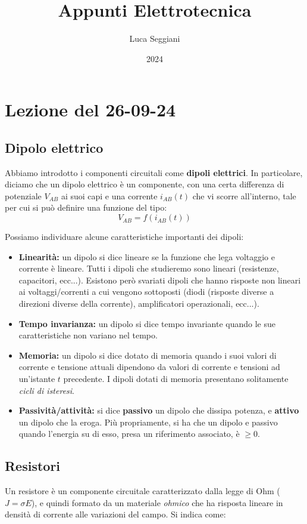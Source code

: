 \documentclass[a4paper,11pt]{article}
\title{Appunti Elettrotecnica}
\author{Luca Seggiani}
\date{2024}
\begin{document}
\section{Lezione del 26-09-24}

\thispagestyle{empty}
\pagestyle{fancy}

\subsection{Dipolo elettrico}
Abbiamo introdotto i componenti circuitali come \textbf{dipoli elettrici}.
In particolare, diciamo che un dipolo elettrico è un componente, con una certa differenza di potenziale $V_{AB}$ ai suoi capi e una corrente $i_{AB}(t)$ che vi scorre all'interno, tale per cui si può definire una funzione del tipo:
$$
V_{AB} = f(i_{AB}(t))
$$

Possiamo individuare alcune caratteristiche importanti dei dipoli:
\begin{itemize}
	\item \textbf{Linearità:} un dipolo si dice lineare se la funzione che lega voltaggio e corrente è lineare.
		Tutti i dipoli che studieremo sono lineari (resistenze, capacitori, ecc...).
		Esistono però svariati dipoli che hanno risposte non lineari ai voltaggi/correnti a cui vengono sottoposti (diodi (risposte diverse a direzioni diverse della corrente), amplificatori operazionali, ecc...).
	\item \textbf{Tempo invarianza:} un dipolo si dice tempo invariante quando le sue caratteristiche non variano nel tempo.
	\item \textbf{Memoria:} un dipolo si dice dotato di memoria quando i suoi valori di corrente e tensione attuali dipendono da valori di corrente e tensioni ad un'istante $t$ precedente.
		I dipoli dotati di memoria presentano solitamente \textit{cicli di isteresi}.
	\item \textbf{Passività/attività:} si dice \textbf{passivo} un dipolo che dissipa potenza, e \textbf{attivo} un dipolo che la eroga.
		Più propriamente, si ha che un dipolo e passivo quando l'energia su di esso, presa un riferimento associato, è $\geq 0$.
\end{itemize}

\subsection{Resistori}
Un resistore è un componente circuitale caratterizzato dalla legge di Ohm ($ J = \sigma E$), e quindi formato da un materiale \textit{ohmico} che ha risposta lineare in densità di corrente alle variazioni del campo.
Si indica come:
\end{document}
